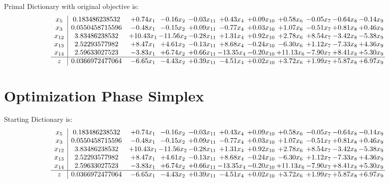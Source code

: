 \documentclass[9pt]{article}
\begin{document}
Primal Dictionary with original objective is:
\[\begin{array}{c| c c@{\hskip 2pt} c@{\hskip 2pt} c@{\hskip 2pt} c@{\hskip 2pt} c@{\hskip 2pt} c@{\hskip 2pt} c@{\hskip 2pt} c@{\hskip 2pt} c@{\hskip 2pt} }
 x_{5}   &  0.183486238532 & +  0.74 x_{1} & -0.16 x_{2} & -0.03 x_{11} & +  0.43 x_{4} & +  0.09 x_{10} & +  0.58 x_{6} & -0.05 x_{7} & -0.64 x_{8} & -0.14 x_{9}\\
 x_{3}   &  0.0550458715596 & -0.48 x_{1} & -0.15 x_{2} & +  0.09 x_{11} & -0.77 x_{4} & +  0.03 x_{10} & +  1.07 x_{6} & -0.51 x_{7} & +  0.81 x_{8} & +  0.46 x_{9}\\
 x_{12}   &  3.83486238532 & + 10.43 x_{1} & -11.56 x_{2} & -0.28 x_{11} & +  1.31 x_{4} & +  0.92 x_{10} & +  2.78 x_{6} & +  8.54 x_{7} & -3.42 x_{8} & -5.38 x_{9}\\
 x_{13}   &  2.52293577982 & +  8.47 x_{1} & +  4.61 x_{2} & -0.13 x_{11} & +  8.68 x_{4} & -0.24 x_{10} & -6.30 x_{6} & +  1.12 x_{7} & -7.33 x_{8} & +  4.36 x_{9}\\
 x_{14}   &  2.59633027523 & -3.83 x_{1} & +  6.74 x_{2} & +  0.66 x_{11} & -13.35 x_{4} & -0.20 x_{10} & + 11.13 x_{6} & -7.90 x_{7} & +  8.41 x_{8} & +  5.30 x_{9}\\
\hline
z    &  0.0366972477064 & -6.65 x_{1} & -4.43 x_{2} & +  0.39 x_{11} & -4.51 x_{4} & +  0.02 x_{10} & +  3.72 x_{6} & +  1.99 x_{7} & +  5.87 x_{8} & +  6.97 x_{9}\\
\end{array}\]
\section{Optimization Phase Simplex}
Starting Dictionary is:
\[\begin{array}{c| c c@{\hskip 2pt} c@{\hskip 2pt} c@{\hskip 2pt} c@{\hskip 2pt} c@{\hskip 2pt} c@{\hskip 2pt} c@{\hskip 2pt} c@{\hskip 2pt} c@{\hskip 2pt} }
 x_{5}   &  0.183486238532 & +  0.74 x_{1} & -0.16 x_{2} & -0.03 x_{11} & +  0.43 x_{4} & +  0.09 x_{10} & +  0.58 x_{6} & -0.05 x_{7} & -0.64 x_{8} & -0.14 x_{9}\\
 x_{3}   &  0.0550458715596 & -0.48 x_{1} & -0.15 x_{2} & +  0.09 x_{11} & -0.77 x_{4} & +  0.03 x_{10} & +  1.07 x_{6} & -0.51 x_{7} & +  0.81 x_{8} & +  0.46 x_{9}\\
 x_{12}   &  3.83486238532 & + 10.43 x_{1} & -11.56 x_{2} & -0.28 x_{11} & +  1.31 x_{4} & +  0.92 x_{10} & +  2.78 x_{6} & +  8.54 x_{7} & -3.42 x_{8} & -5.38 x_{9}\\
 x_{13}   &  2.52293577982 & +  8.47 x_{1} & +  4.61 x_{2} & -0.13 x_{11} & +  8.68 x_{4} & -0.24 x_{10} & -6.30 x_{6} & +  1.12 x_{7} & -7.33 x_{8} & +  4.36 x_{9}\\
 x_{14}   &  2.59633027523 & -3.83 x_{1} & +  6.74 x_{2} & +  0.66 x_{11} & -13.35 x_{4} & -0.20 x_{10} & + 11.13 x_{6} & -7.90 x_{7} & +  8.41 x_{8} & +  5.30 x_{9}\\
\hline
z    &  0.0366972477064 & -6.65 x_{1} & -4.43 x_{2} & +  0.39 x_{11} & -4.51 x_{4} & +  0.02 x_{10} & +  3.72 x_{6} & +  1.99 x_{7} & +  5.87 x_{8} & +  6.97 x_{9}\\
\end{array}\]
\end{document}
